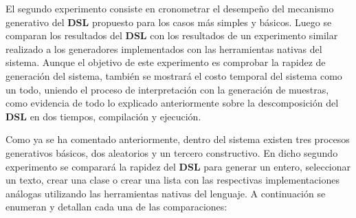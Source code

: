 El segundo experimento consiste en cronometrar el desempeño del mecanismo generativo del {\bf DSL} propuesto para los casos más simples y
básicos. Luego se comparan los resultados del {\bf DSL} con los resultados de un experimento similar realizado a los generadores implementados
con las herramientas nativas del sistema. Aunque el objetivo de este experimento es comprobar la rapidez de generación del sistema,
también se mostrará el costo temporal del sistema como un todo, uniendo el proceso de interpretación con la generación de muestras,
como evidencia de todo lo explicado anteriormente sobre la descomposición del {\bf DSL} en dos tiempos, compilación y ejecución.

Como ya se ha comentado anteriormente, dentro del sistema existen tres procesos generativos básicos, dos aleatorios y un tercero
constructivo. En dicho segundo experimento se comparará la rapidez del {\bf DSL} para generar un entero, seleccionar un texto, crear una
clase o crear una lista con las respectivas implementaciones análogas utilizando las herramientas nativas del lenguaje. A continuación
se enumeran y detallan cada una de las comparaciones:
